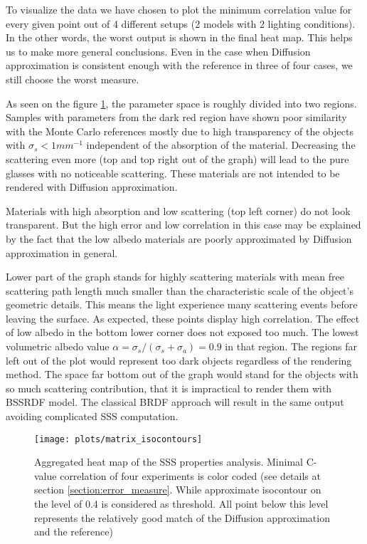 To visualize the data we have chosen to plot the minimum correlation value for every given point out
of 4 different setups (2 models with 2 lighting conditions). In the other words, the worst output is
shown in the final heat map. This helps us to make more general conclusions. Even in the case when
Diffusion approximation is consistent enough with the reference in three of four cases, we still
choose the worst measure.

As seen on the figure \ref{fig:material_props}, the parameter space is roughly divided into two
regions. Samples with parameters from the dark red region have shown poor similarity with the Monte
Carlo references mostly due to high transparency of the objects with $\sigma_s<1 mm^{-1}$
independent of the absorption of the material. Decreasing the scattering even more (top and top
right out of the graph) will lead to the pure glasses with no noticeable scattering. These materials
are not intended to be rendered with Diffusion approximation.

Materials with high absorption and low scattering (top left corner) do not look transparent. But the
high error and low correlation in this case may be explained by the fact that the low albedo
materials are poorly approximated by Diffusion approximation in general.

Lower part of the graph stands for highly scattering materials with mean free scattering path length
much smaller than the characteristic scale of the object's geometric details. This means the light
experience many scattering events before leaving the surface. As expected, these points display high
correlation. The effect of low albedo in the bottom lower corner does not exposed too much. The
lowest volumetric albedo value $\alpha=\sigma_s/(\sigma_s+\sigma_a)=0.9$  in that region. The
regions far left out of the plot would represent too dark objects regardless of the rendering
method. The space far bottom out of the graph would stand for the objects with so much scattering
contribution, that it is impractical to render them with BSSRDF model. The classical BRDF approach
will result in the same output avoiding complicated SSS computation.

\begin{figure}[h]
    \texttt{[image: plots/matrix\_isocontours]}
    \caption{Aggregated heat map of the SSS properties analysis. Minimal C-value correlation of four
    experiments is color coded (see details at section \ref{section:error_measure}. While
    approximate isocontour on the level of 0.4 is considered as threshold. All point below this
    level represents the relatively good match of the Diffusion approximation and the reference) }
    \label{fig:material_props}
\end{figure}

